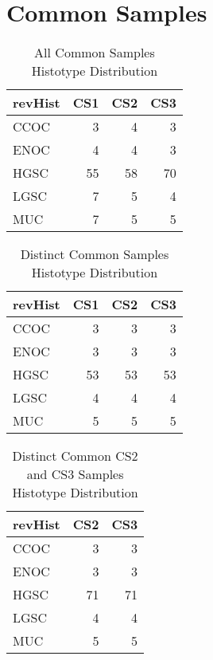 \documentclass[
]{report}
\begin{document}
\hypertarget{common-samples}{%
\section{Common Samples}\label{common-samples}}

\begin{table}

\caption{\label{tab:common-dist-all}All Common Samples Histotype Distribution}
\centering
\begin{tabular}[t]{l|r|r|r}
\hline
revHist & CS1 & CS2 & CS3\\
\hline
CCOC & 3 & 4 & 3\\
\hline
ENOC & 4 & 4 & 3\\
\hline
HGSC & 55 & 58 & 70\\
\hline
LGSC & 7 & 5 & 4\\
\hline
MUC & 7 & 5 & 5\\
\hline
\end{tabular}
\end{table}

\begin{table}

\caption{\label{tab:common-dist-distinct}Distinct Common Samples Histotype Distribution}
\centering
\begin{tabular}[t]{l|r|r|r}
\hline
revHist & CS1 & CS2 & CS3\\
\hline
CCOC & 3 & 3 & 3\\
\hline
ENOC & 3 & 3 & 3\\
\hline
HGSC & 53 & 53 & 53\\
\hline
LGSC & 4 & 4 & 4\\
\hline
MUC & 5 & 5 & 5\\
\hline
\end{tabular}
\end{table}

\begin{table}

\caption{\label{tab:common-cs2-cs3-dist-distinct}Distinct Common CS2 and CS3 Samples Histotype Distribution}
\centering
\begin{tabular}[t]{l|r|r}
\hline
revHist & CS2 & CS3\\
\hline
CCOC & 3 & 3\\
\hline
ENOC & 3 & 3\\
\hline
HGSC & 71 & 71\\
\hline
LGSC & 4 & 4\\
\hline
MUC & 5 & 5\\
\hline
\end{tabular}
\end{table}
\end{document}
